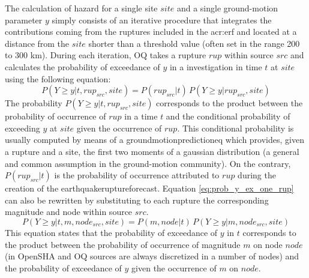 The calculation of hazard for a single site $site$ and a single 
ground-motion parameter $y$ simply consists of an iterative procedure 
that integrates the contributions coming from the ruptures included in 
the \gls{acr:erf} and located at a distance from the $site$ shorter 
than a threshold value (often set in the range 200 to 300 km). 
%
During each iteration, OQ takes a rupture $rup$ within source $src$ and
calculates the probability of exceedance of $y$ in a investigation in 
time $t$ at $site$ using the following equation:
\begin{equation}
P(Y \geq y|t,rup_{src},site) = 
	P(rup_{src}|t)\,
	P(Y\geq y|rup_{src},site)
\label{eq:prob_y_ex_one_rup}
\end{equation}
The probability $P(Y \geq y|t,rup_{src},site)$ corresponds to 
the product between the probability of occurrence of $rup$ in a time 
$t$ and the conditional probability of exceeding $y$ at $site$ 
given the occurrence of $rup$. 
%
This conditional probability is usually computed by means of a 
\gls{groundmotionpredictioneq} which provides, given a rupture 
and a site, the first two moments of a gaussian distribution 
(a general and common assumption in the ground-motion community). 
%
On the contrary, $P(rup_{src}|t)$ is the probability of occurrence 
attributed to $rup$ during the creation of the 
\gls{earthquakeruptureforecast}.
Equation \ref{eq:prob_y_ex_one_rup} can also be rewritten by 
substituting to each rupture the corresponding magnitude and 
node within source $src$.
\begin{equation}
P(Y \geq y|t,m,node_{src},site) = 
	P(m,node|t)\,
	P(Y\geq y|m,node_{src},site)
\end{equation}
This equation states that the probability of exceedance of $y$ in $t$
corresponds to the product between the probability of occurrence
of magnitude $m$ on node $node$ (in OpenSHA and OQ sources are always 
discretized in a number of nodes) and the probability of exceedance of
$y$ given the occurrence of $m$ on $node$. 

